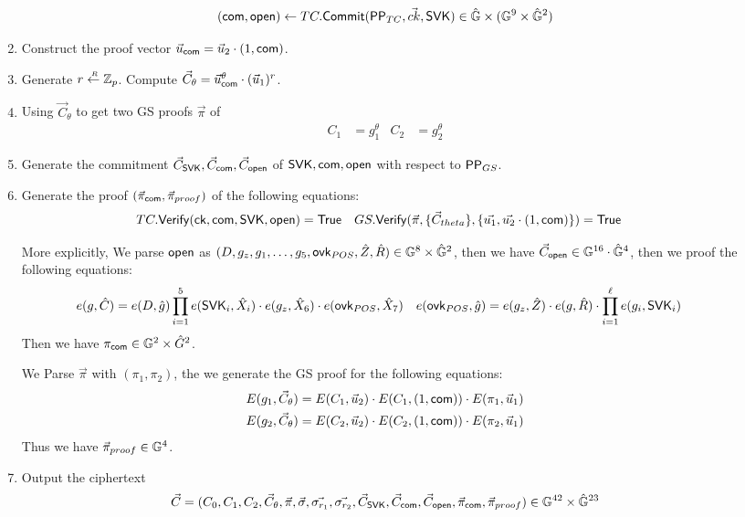 \begin{description}
\begin{enumerate}
      $$(\mathsf{com}, \mathsf{open}) \gets TC.{\mathsf{Commit}}(\mathsf{PP}_{TC}, \vec{ck}, \mathsf{SVK}) \in \hat{\mathbb{G}} \times (\mathbb{G}^9 \times \hat{\mathbb{G}}^2)$$
      \item Construct the proof vector $\vec{u}_{\mathsf{com}} = \vec{u}_2\cdot (1, \mathsf{com})$. 
      \item Generate $r \stackrel{{\scriptscriptstyle \mkern4mu R}}{\gets} \mathbb{Z}_p$. Compute $\vec{C}_{\theta} = \vec{u}_{\mathsf{com}}^{\theta} \cdot (\vec{u}_1)^r$.
      \item Using $\vec{C}_{\theta}$ to get two GS proofs $\vec{\pi}$ of
        \begin{align*}
          C_1 &= g_1^{\theta} & C_2 &= g_2^{\theta}
        \end{align*}
      \item Generate the commitment $\vec{C}_{\mathsf{SVK}}, \vec{C}_{\mathsf{com}}, \vec{C}_{\mathsf{open}}$ of $\mathsf{SVK}, \mathsf{com}, \mathsf{open}$ with respect to $\mathsf{PP}_{GS}$.
      \item Generate the proof $(\vec{\pi}_{\mathsf{com}}, \vec{\pi}_{proof})$ of the following equations:
      \begin{align*}
      	TC.{\mathsf{Verify}}(\mathsf{ck}, \mathsf{com}, \mathsf{SVK}, \mathsf{open}) &= \mathsf{True} & GS.{\mathsf{Verify}}(\vec{\pi}, \{\vec{C}_{theta}\}, \{\vec{u_1}, \vec{u_2} \cdot (1, \mathsf{com})\}) &= \mathsf{True}
      \end{align*}
      
      More explicitly, We parse $\mathsf{open}$ as $(D, g_z, g_1, \dots, g_5, \mathsf{ovk}_{POS}, \hat{Z}, \hat{R}) \in \mathbb{G}^8 \times \hat{\mathbb{G}}^2$, then we have $\vec{C}_{\mathsf{open}} \in \mathbb{G}^{16} \cdot \hat{\mathbb{G}}^4$, then we proof the following equations:
      \begin{align*}
	e(g, \hat{C}) &= e(D, \hat{g}) \prod_{i = 1}^{5} e(\mathsf{SVK}_i, \hat{X}_i) \cdot e(g_z, \hat{X}_6) \cdot e(\mathsf{ovk}_{POS}, \hat{X}_7) & e(\mathsf{ovk}_{POS}, \hat{g}) &= e(g_z, \hat{Z}) \cdot e(g, \hat{R}) \cdot \prod_{i = 1}^\ell e(g_i, \mathsf{SVK}_i) 
      \end{align*}
      Then we have $\pi_{\mathsf{com}} \in \mathbb{G}^2 \times \hat{G}^2$.
      
      We Parse $\vec{\pi}$ with $(\pi_1, \pi_2)$, the we generate the GS proof for the following equations:
      \begin{align*}
      E(g_1, \vec{C}_\theta) &= E(C_1, \vec{u}_2) \cdot E(C_1, (1, \mathsf{com})) \cdot E(\pi_1, \vec{u}_1)\\
      E(g_2, \vec{C}_\theta) &= E(C_2, \vec{u}_2) \cdot E(C_2, (1, \mathsf{com})) \cdot E(\pi_2, \vec{u}_1)
      \end{align*}
      Thus we have $\vec{\pi}_{proof} \in \mathbb{G}^4$.
      \item Output the ciphertext
        \begin{align*}
          \vec{C} = (C_0, C_1, C_2, \vec{C}_{\theta}, \vec{\pi}, \vec{\sigma}, \vec{\sigma_{r_1}}, \vec{\sigma_{r_2}}, \vec{C}_{\mathsf{SVK}}, \vec{C}_{\mathsf{com}}, \vec{C}_{\mathsf{open}},  \vec{\pi}_{\mathsf{com}}, \vec{\pi}_{proof}) \in \mathbb{G}^{42} \times \hat{\mathbb{G}}^{23}
        \end{align*}
        

\end{enumerate}
\end{description}
